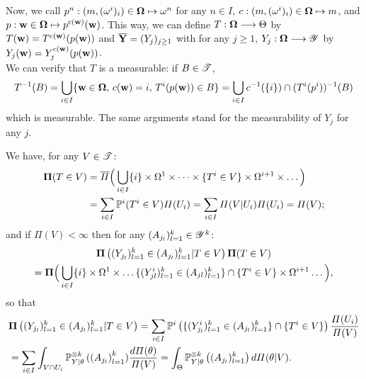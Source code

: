 Now, we call $p^n:(m,(\omega^i)_i)\in\mathbf{\Omega}\mapsto \omega^n$ for any $n\in I$, $c:(m,(\omega^i)_i)\in\mathbf{\Omega}\mapsto m$, and $p:\mathbf{w}\in\mathbf{\Omega}\mapsto p^{c(\mathbf{w})}(\mathbf{w})$.
This way, we can define $T:\mathbf{\Omega}\longrightarrow\Theta$ by $T(\mathbf{w})=T^{c(\mathbf{w})}(p(\mathbf{w}))$ and $\overline{\mathbf{Y}}=(Y_j)_{j\geq1}$ with for any $j\geq1$, $Y_j:\mathbf{\Omega}\longrightarrow\mathscr{Y}$ by $Y_j(\mathbf{w})=Y_j^{c(\mathbf{w})}(p(\mathbf{w}))$.\\
We can verify that $T$ is a measurable: if $B\in\mathscr{T}$,  
    \begin{equation}
        T^{-1}(B) = \bigcup_{i\in I}\{\mathbf{w}\in\mathbf{\Omega},\, c(\mathbf{w})=i,\,T^i(p(\mathbf{w}))\in B  \} = \bigcup_{i\in I}c^{-1}(\{i\})\cap (T^i(p^i))^{-1}(B)
    \end{equation}
which is measurable. 
The same arguments stand for the measurability of $Y_j$ for any $j$.




%



We have,
for any $V\in\mathscr{T}$:
    \begin{align}
          \mathbf{\Pi}(T\in V) &= \overline{\varPi}\Big(\bigcup_{i\in I}\{i\}\times\Omega^1\times\dots\times\{T^i\in V\}\times\Omega^{i+1}\times\dots\Big)\\
          &=\sum_{i\in I}\mathbb{P}^i(T^i\in V)\varPi(U_i) = \sum_{i\in I}\varPi(V|U_i)\varPi(U_i) = \varPi(V);\nonumber
    \end{align}
and if $\varPi(V)<\infty$ then for any $(A_{j_l})_{l=1}^k\in\mathscr{Y}^k$: %
    \begin{multline}
        \mathbf{\Pi}\left((Y_{j_l})_{l=1}^k\in(A_{j_l})_{l=1}^k|T\in V\right)\mathbf{\Pi}(T\in V) \\ = 
        \mathbf{\Pi}\Big(\bigcup_{i\in I}  \{i\}\times\Omega^1\times\dots\{(Y^i_{jl})_{l=1}^k\in(A_{jl})_{l=1}^k\}\cap \{T^i\in V \}\times\Omega^{i+1}\dots 
        \Big),
    \end{multline}
    so that
        \begin{align}\nonumber
        &\mathbf{\Pi}\left((Y_{j_l})_{l=1}^k\in(A_{j_l})_{l=1}^k|T\in V\right) 
            = \sum_{i\in I}\mathbb{P}^i\left( \{(Y_{j_l}^i)_{l=1}^k\in(A_{j_l})_{l=1}^k\}\cap \{T^i\in V\}\right)\frac{\varPi(U_i)}{\varPi(V)} \\
            &= \sum_{i\in I}\int_{V\cap U_i}\mathbb{P}^{\otimes k}_{Y|\theta}\left((A_{j_l}\right)_{l=1}^k)\frac{d\varPi(\theta)}{\varPi(V)}  = \int_\Theta\mathbb{P}^{\otimes k}_{Y|\theta}\left((A_{j_l})_{l=1}^k\right)d\varPi(\theta|V).
    \end{align}


